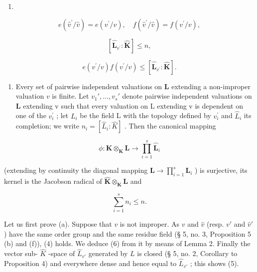 \begin{enumerate}
\def\labelenumi{(\arabic{enumi})}
\setcounter{enumi}{3}
\tightlist
\item
\end{enumerate}

\[
e (\hat {v} ^ {\prime} / \hat {v}) = e (v ^ {\prime} / v), \quad f (\hat {v} ^ {\prime} / \hat {v}) = f (v ^ {\prime} / v),\tag{5}
\]

\[
[ \hat {\mathbf {L}} _ {v ^ {\prime}}: \hat {\mathbf {K}} ] \leqslant n,\tag{6}
\]

\[
e (v ^ {\prime} / v) f (v ^ {\prime} / v) \leqslant [ \hat {\mathbf {L}} _ {v ^ {\prime}}: \hat {\mathbf {K}} ].
\]

\begin{enumerate}
\def\labelenumi{(\alph{enumi})}
\setcounter{enumi}{1}
\tightlist
\item
  Every set of pairwise independent valuations on \(\mathbf{L}\) extending a non-improper valuation \(v\) is finite. Let \(v_{1}',\ldots ,v_{s}'\) denote pairwise independent valuations on \(\mathbf{L}\) extending v such that every valuation on L extending v is dependent on one of the \(v_{i}^{\prime}\) ; let \(L_{i}\) be the field L with the topology defined by \(v_{i}^{\prime}\) and \(\hat{L}_{i}\) its completion; we write \(n_{i} = [\hat{L}_{i}: \hat{K}]\) . Then the canonical mapping
\end{enumerate}

\[
\phi : \hat {\mathbf {K}} \otimes_ {\mathbf {K}} \mathbf {L} \rightarrow \prod_ {i = 1} ^ {s} \hat {\mathbf {L}} _ {i}
\]

(extending by continuity the diagonal mapping \(\mathbf{L} \to \prod_{i=1}^{s} \mathbf{L}_i\) ) is surjective, its kernel is the Jacobson radical of \(\hat{\mathbf{K}} \otimes_{\mathbf{K}} \mathbf{L}\) and

\[
\sum_ {i = 1} ^ {s} n _ {i} \leqslant n.\tag{7}
\]

Let us first prove (a). Suppose that \(v\) is not improper. As \(v\) and \(\hat{v}\) (resp. \(v'\) and \(\hat{v}'\) ) have the same order group and the same residue field (§ 5, no. 3, Proposition 5 (b) and (f)), (4) holds. We deduce (6) from it by means of Lemma 2. Finally the vector sub- \(\hat{K}\) -space of \(\hat{L}_{v'}\) generated by \(L\) is closed (§ 5, no. 2, Corollary to Proposition 4) and everywhere dense and hence equal to \(\hat{L}_{v'}\) ; this shows (5).

